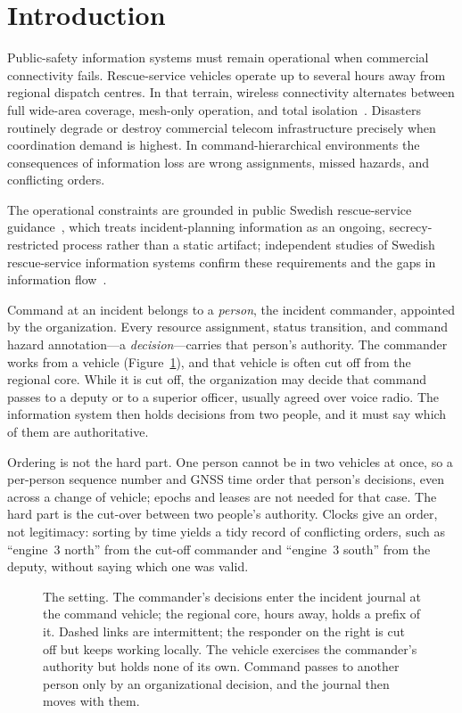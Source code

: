 \section{Introduction}
\label{sec:introduction}

Public-safety information systems must remain operational when commercial connectivity fails.
Rescue-service vehicles operate up to several hours away from regional dispatch centres. In that terrain, wireless connectivity alternates between full wide-area coverage, mesh-only operation, and total isolation~\cite{zimbelman2022mesh, wang2023overview}.
Disasters routinely degrade or destroy commercial telecom infrastructure precisely when
coordination demand is highest. In command-hierarchical environments the consequences of
information loss are wrong assignments, missed hazards, and conflicting orders.

The operational constraints are grounded in public Swedish rescue-service
guidance~\cite{rsg-rad201, rsg-kommunalplan}, which treats incident-planning information
as an ongoing, secrecy-restricted process rather than a static artifact; independent
studies of Swedish rescue-service information systems confirm these requirements and the
gaps in information flow~\cite{pilemalm2014enabling, westman2021mobilisation}.

Command at an incident belongs to a \emph{person}, the incident commander, appointed by
the organization. Every resource assignment, status transition, and command hazard
annotation---a \emph{decision}---carries that person's authority. The commander works
from a vehicle (Figure~\ref{fig:setting}), and that vehicle is often cut off from the
regional core. While it is cut off, the organization may decide that command passes to a
deputy or to a superior officer, usually agreed over voice radio. The information system
then holds decisions from two people, and it must say which of them are authoritative.

Ordering is not the hard part. One person cannot be in two vehicles at once, so a
per-person sequence number and GNSS time order that person's decisions, even across a
change of vehicle; epochs and leases are not needed for that case. The hard part is the
cut-over between two people's authority. Clocks give an order, not legitimacy: sorting by
time yields a tidy record of conflicting orders, such as ``engine~3 north'' from the cut-off
commander and ``engine~3 south'' from the deputy, without saying which one was valid.

\begin{figure}[t]
\centering

\caption{The setting. The commander's decisions enter the incident journal at the command
vehicle; the regional core, hours away, holds a prefix of it. Dashed links are
intermittent; the responder on the right is cut off but keeps working locally. The
vehicle exercises the commander's authority but holds none of its own. Command passes to
another person only by an organizational decision, and the journal then moves with
them.}
\label{fig:setting}
\end{figure}

